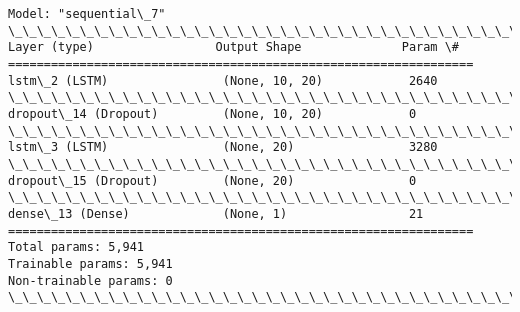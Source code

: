 \documentclass[11pt]{article}
\begin{document}
    \begin{Verbatim}[commandchars=\\\{\}]
Model: "sequential\_7"
\_\_\_\_\_\_\_\_\_\_\_\_\_\_\_\_\_\_\_\_\_\_\_\_\_\_\_\_\_\_\_\_\_\_\_\_\_\_\_\_\_\_\_\_\_\_\_\_\_\_\_\_\_\_\_\_\_\_\_\_\_\_\_\_\_
Layer (type)                 Output Shape              Param \#
=================================================================
lstm\_2 (LSTM)                (None, 10, 20)            2640
\_\_\_\_\_\_\_\_\_\_\_\_\_\_\_\_\_\_\_\_\_\_\_\_\_\_\_\_\_\_\_\_\_\_\_\_\_\_\_\_\_\_\_\_\_\_\_\_\_\_\_\_\_\_\_\_\_\_\_\_\_\_\_\_\_
dropout\_14 (Dropout)         (None, 10, 20)            0
\_\_\_\_\_\_\_\_\_\_\_\_\_\_\_\_\_\_\_\_\_\_\_\_\_\_\_\_\_\_\_\_\_\_\_\_\_\_\_\_\_\_\_\_\_\_\_\_\_\_\_\_\_\_\_\_\_\_\_\_\_\_\_\_\_
lstm\_3 (LSTM)                (None, 20)                3280
\_\_\_\_\_\_\_\_\_\_\_\_\_\_\_\_\_\_\_\_\_\_\_\_\_\_\_\_\_\_\_\_\_\_\_\_\_\_\_\_\_\_\_\_\_\_\_\_\_\_\_\_\_\_\_\_\_\_\_\_\_\_\_\_\_
dropout\_15 (Dropout)         (None, 20)                0
\_\_\_\_\_\_\_\_\_\_\_\_\_\_\_\_\_\_\_\_\_\_\_\_\_\_\_\_\_\_\_\_\_\_\_\_\_\_\_\_\_\_\_\_\_\_\_\_\_\_\_\_\_\_\_\_\_\_\_\_\_\_\_\_\_
dense\_13 (Dense)             (None, 1)                 21
=================================================================
Total params: 5,941
Trainable params: 5,941
Non-trainable params: 0
\_\_\_\_\_\_\_\_\_\_\_\_\_\_\_\_\_\_\_\_\_\_\_\_\_\_\_\_\_\_\_\_\_\_\_\_\_\_\_\_\_\_\_\_\_\_\_\_\_\_\_\_\_\_\_\_\_\_\_\_\_\_\_\_\_
    \end{Verbatim}
\end{document}
